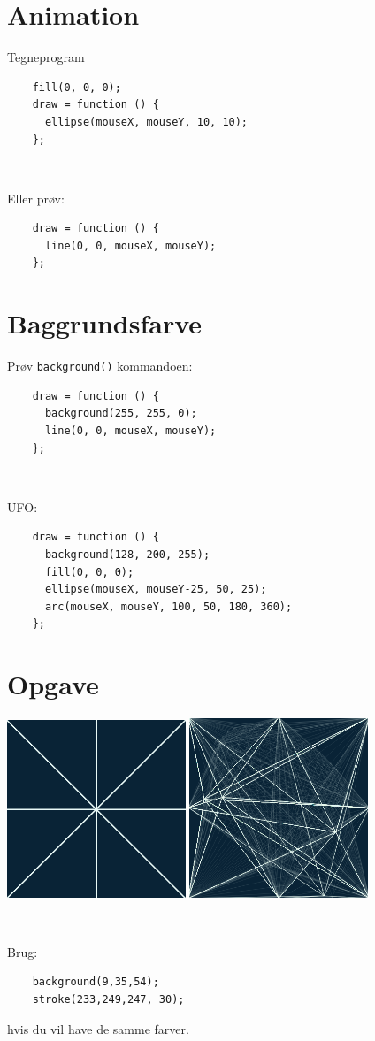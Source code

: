 \documentclass[oneside,a4paper,10pts,article]{memoir}
\begin{document}
\newpage
\chapter{Animation}

\noindent
Tegneprogram
\begin{lstlisting}
    fill(0, 0, 0);
    draw = function () {
      ellipse(mouseX, mouseY, 10, 10);
    };
\end{lstlisting}

~

\noindent
Eller prøv:
\begin{lstlisting}
    draw = function () {
      line(0, 0, mouseX, mouseY);
    };
\end{lstlisting}

\chapter{Baggrundsfarve}

Prøv \texttt{background()} kommandoen:
\begin{lstlisting}
    draw = function () {
      background(255, 255, 0);
      line(0, 0, mouseX, mouseY);
    };
\end{lstlisting}

~

\noindent
UFO:
\begin{lstlisting}
    draw = function () {
      background(128, 200, 255);
      fill(0, 0, 0);
      ellipse(mouseX, mouseY-25, 50, 25);
      arc(mouseX, mouseY, 100, 50, 180, 360);
    };
\end{lstlisting}

\chapter{Opgave}

\hspace{1cm}\includegraphics[width=0.4\textwidth]{pics/kryds.png}
\hspace{1cm}\includegraphics[width=0.4\textwidth]{pics/kryds-tegning.png}

~

\noindent
Brug:
\begin{lstlisting}
    background(9,35,54);
    stroke(233,249,247, 30);
\end{lstlisting}
hvis du vil have de samme farver.
\end{document}
